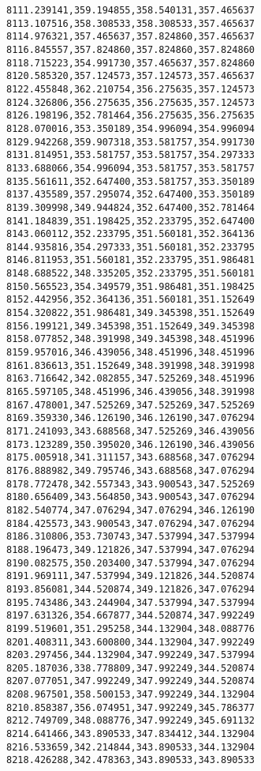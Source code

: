 \documentclass[11pt]{article}
\begin{document}
\begin{Verbatim}[commandchars=\\\{\}]
8111.239141,359.194855,358.540131,357.465637
8113.107516,358.308533,358.308533,357.465637
8114.976321,357.465637,357.824860,357.465637
8116.845557,357.824860,357.824860,357.824860
8118.715223,354.991730,357.465637,357.824860
8120.585320,357.124573,357.124573,357.465637
8122.455848,362.210754,356.275635,357.124573
8124.326806,356.275635,356.275635,357.124573
8126.198196,352.781464,356.275635,356.275635
8128.070016,353.350189,354.996094,354.996094
8129.942268,359.907318,353.581757,354.991730
8131.814951,353.581757,353.581757,354.297333
8133.688066,354.996094,353.581757,353.581757
8135.561611,352.647400,353.581757,353.350189
8137.435589,357.295074,352.647400,353.350189
8139.309998,349.944824,352.647400,352.781464
8141.184839,351.198425,352.233795,352.647400
8143.060112,352.233795,351.560181,352.364136
8144.935816,354.297333,351.560181,352.233795
8146.811953,351.560181,352.233795,351.986481
8148.688522,348.335205,352.233795,351.560181
8150.565523,354.349579,351.986481,351.198425
8152.442956,352.364136,351.560181,351.152649
8154.320822,351.986481,349.345398,351.152649
8156.199121,349.345398,351.152649,349.345398
8158.077852,348.391998,349.345398,348.451996
8159.957016,346.439056,348.451996,348.451996
8161.836613,351.152649,348.391998,348.391998
8163.716642,342.082855,347.525269,348.451996
8165.597105,348.451996,346.439056,348.391998
8167.478001,347.525269,347.525269,347.525269
8169.359330,346.126190,346.126190,347.076294
8171.241093,343.688568,347.525269,346.439056
8173.123289,350.395020,346.126190,346.439056
8175.005918,341.311157,343.688568,347.076294
8176.888982,349.795746,343.688568,347.076294
8178.772478,342.557343,343.900543,347.525269
8180.656409,343.564850,343.900543,347.076294
8182.540774,347.076294,347.076294,346.126190
8184.425573,343.900543,347.076294,347.076294
8186.310806,353.730743,347.537994,347.537994
8188.196473,349.121826,347.537994,347.076294
8190.082575,350.203400,347.537994,347.076294
8191.969111,347.537994,349.121826,344.520874
8193.856081,344.520874,349.121826,347.076294
8195.743486,343.244904,347.537994,347.537994
8197.631326,354.667877,344.520874,347.992249
8199.519601,351.295258,344.132904,348.088776
8201.408311,343.600800,344.132904,347.992249
8203.297456,344.132904,347.992249,347.537994
8205.187036,338.778809,347.992249,344.520874
8207.077051,347.992249,347.992249,344.520874
8208.967501,358.500153,347.992249,344.132904
8210.858387,356.074951,347.992249,345.786377
8212.749709,348.088776,347.992249,345.691132
8214.641466,343.890533,347.834412,344.132904
8216.533659,342.214844,343.890533,344.132904
8218.426288,342.478363,343.890533,343.890533

\end{Verbatim}
\end{document}
